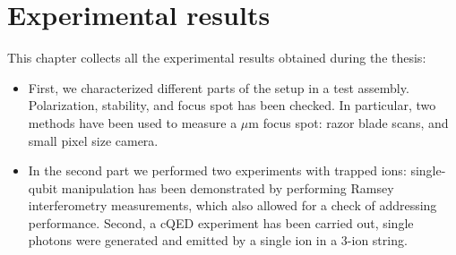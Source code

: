 
\chapter{Experimental results}
\label{ch:results}
This chapter collects all the experimental results obtained during the thesis:
\begin{itemize}
\item First, we characterized different parts of the setup in a test assembly. Polarization, stability, and focus spot has been checked. In particular, two methods have been used to measure a $\mu$m focus spot: razor blade scans, and small pixel size camera.
\item In the second part we performed two experiments with trapped ions: single-qubit manipulation has been demonstrated by performing Ramsey interferometry measurements, which also allowed for a check of addressing performance. Second, a cQED experiment has been carried out, single photons were generated and emitted by a single ion in a 3-ion string.
\end{itemize}
